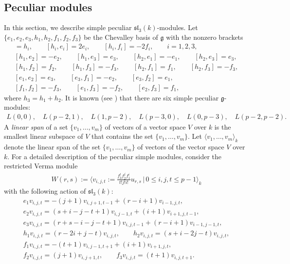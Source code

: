 \documentclass[pdftex]{sigma}%
\numberwithin{equation}{section}
\begin{document}
\subsection{Peculiar modules}
\label{ss22}
In this section, we describe simple peculiar $\mathfrak{sl}_3(k)$-modules.
Let $\{e_1,e_2,e_3,h_1,h_2,f_1,f_2,f_3\}$ be the Chevalley basis of $\mathfrak{g}$ with the nonzero brackets
\begin{gather*}
[e_i,f_i]=h_i,\qquad [h_i,e_i]=2e_i,\qquad [h_i,f_i]=-2f_i,\qquad i=1,2,3,
\\
[h_1,e_2]=-e_2,\qquad [h_1,e_3]=e_3,\qquad [h_2,e_1]=-e_1,\qquad [h_2,e_3]=e_3,
\\
[h_1,f_2]=f_2,\qquad [h_1,f_3]=-f_3,\qquad [h_2,f_1]=f_1,\qquad [h_2,f_3]=-f_3,
\\
[e_1,e_2]=e_3,\qquad [e_3,f_1]=-e_2,\qquad [e_3,f_2]=e_1,
\\
[f_1,f_2]=-f_3,\qquad [e_1,f_3]=-f_2,\qquad [e_2,f_3]=f_1,
\end{gather*}
where $h_3=h_1+h_2$.
It is known (see \cite[p.~145]{DI02}) that there are six simple peculiar $\mathfrak{g}$-modules:
\begin{gather*}
L(0,0),\quad L(p-2,1),\quad L(1,p-2),\quad L(p-3,0),\quad L(0,p-3),\quad L(p-2,p-2).
\end{gather*}
A {\it linear span} of a set $\{v_1,\dots,v_m\}$ of vectors of a vector space $V$ over $k$ is the smallest linear subspace of $V$ that contains the set $\{v_1,\dots,v_m\}$. Let $\langle v_1,\dots,v_m\rangle_{k}$ denote the linear span of the set $\{v_1,\dots,v_m\}$ of vectors of the vector space $V$ over $k$. For a detailed description of the peculiar simple modules, consider the restricted Verma module
\begin{gather*}
W(r,s):=\bigg\langle v_{i,j,t}:=\frac{f_3^tf_2^jf_1^i}{t!j!i!}u_{r,s}\,\bigg|\,0\leq i,j,t\leq p-1\bigg\rangle_{k}
\end{gather*}
with the following action of $\mathfrak{sl}_3(k)$:
\begin{gather*}
e_1v_{i,j,t}=-(j+1)v_{i,j+1,t-1}+(r-i+1)v_{i-1,j,t},
\\
e_2v_{i,j,t}=(s+i-j-t+1)v_{i,j-1,t}+(i+1)v_{i+1,j,t-1},
\\
e_3v_{i,j,t}=(r+s-i-j-t+1)v_{i,j,t-1}+(r-i+1)v_{i-1,j-1,t},
\\
h_1v_{i,j,t}=(r-2i+j-t)v_{i,j,t},
\qquad
h_2v_{i,j,t}=(s+i-2j-t)v_{i,j,t},
\\
f_1v_{i,j,t}=-(t+1)v_{i,j-1,t+1}+(i+1)v_{i+1,j,t},
\\
f_2v_{i,j,t}=(j+1)v_{i,j+1,t},
\qquad
f_3v_{i,j,t}=(t+1)v_{i,j,t+1}.
\end{gather*}
\end{document}
